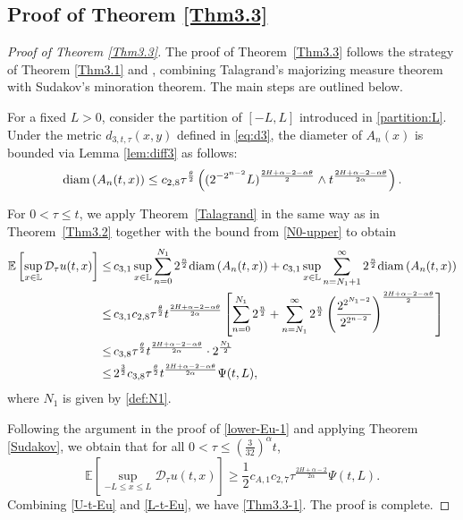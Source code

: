 \documentclass[11pt,reqno]{amsart}
\numberwithin{equation}{section}
\def\beq{\begin{equation}}
\def\nneq{\end{equation}}
\def\EE{\mathbb{E}}
\def\bL{\mathbb{L}}
\newcommand\diam { {\rm{diam\,}}}
\newcommand{\1}{{\bf 1}}
\newcommand{\2}{{\bf 2}}
\newcommand{\lc}{\left(}
\newcommand{\rc}{\right)}
\newcommand{\lk}{\left[}
\newcommand{\rk}{\right]}
\begin{document}
\subsection{Proof of  Theorem \ref{Thm3.3}}
\begin{proof}[Proof of  Theorem \ref{Thm3.3}]
The proof of Theorem~\ref{Thm3.3} follows the strategy of  Theorem \ref{Thm3.1} and  \cite[Theorem 1.3]{HW2022}, combining Talagrand's majorizing measure theorem with Sudakov's minoration theorem. The main steps are outlined below.

For a fixed $L>0$, consider the partition of $[-L, L]$ introduced in \eqref{partition:L}. Under the metric $d_{3,t,\tau}(x,y)$ defined in \eqref{eq:d3}, the diameter of $A_n(x)$ is bounded  via Lemma \ref{lem:diff3}  as follows: 
\[
\diam(A_n(t,x))\le c_{2,8}\tau^{\frac{\theta}{2}}\lc (2^{-2^{n-2}}L)^{\frac{2H+\alpha-2-\alpha\theta}{2}}\wedge t^{\frac{2H+\alpha-2-\alpha\theta}{2\alpha}}\rc.
\]

For  $0<\tau\leq t$,  we apply  Theorem~\ref{Talagrand} in the same way as in Theorem~\ref{Thm3.2} together with the bound from \eqref{N0-upper} to obtain
\begin{equation}\label{U-t-Eu}
\begin{split}
\EE\lk\sup_{x\in\bL}\mathcal D_{\tau} u(t,x)\rk
\leq&\, c_{3,1}\sup_{x\in\bL}\sum_{n=0}^{N_1}2^{\frac{n}{2}}\diam(A_n(t,x))
    +c_{3,1} \sup_{x\in\bL}\sum_{n= N_1+1}^{\infty}2^{\frac{n}{2}} \diam(A_n(t,x)) \\
\leq&\, c_{3,1}c_{2,8}\tau^{\frac{\theta}{2}}t^{\frac{2H+\alpha-2-\alpha\theta}{2\alpha}}
\lk \sum_{n=0}^{N_1}2^{\frac{n}{2}}+\sum_{n=N_1}^{\infty}2^{\frac{n}{2}}
\lc \frac{2^{2^{N_1-2}}}{2^{2^{n-2}}}\rc^{\frac{2H+\alpha-2-\alpha\theta}{2}}  \rk \\
\leq&\, c_{3,8}\tau^{\frac{\theta}{2}}t^{\frac{2H+\alpha-2-\alpha\theta}{2\alpha}}\cdot2^{\frac{N_1}{2}} \\
\leq& \, 2^{\frac32}c_{3,8}\tau^{\frac{\theta}{2}}t^{\frac{2H+\alpha-2-\alpha\theta}{2\alpha}}\Psi(t,L),
\end{split}
\end{equation}
where $N_1$ is given by \eqref{def:N1}.

Following the argument in the proof of \eqref{lower-Eu-1} and applying Theorem \ref{Sudakov}, we obtain that for all $0 < \tau \leq \left(\frac{3}{32}\right)^\alpha t$,
\beq\label{L-t-Eu}
\EE\left[\sup_{-L\leq x\leq L}\mathcal D_{\tau} u(t,x)\right] \geq \frac{1}{2} c_{A,1}c_{2,7}\tau^{\frac{2H+\alpha-2}{2\alpha}}\Psi(t,L).
\nneq
Combining  \eqref{U-t-Eu} and \eqref{L-t-Eu}, we have   \eqref{Thm3.3-1}.  The proof is complete.
\end{proof}
\end{document}
